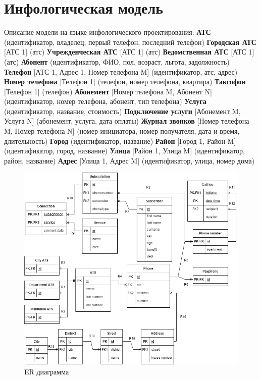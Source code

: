 \documentclass{report}
\begin{document}
\section{Инфологическая модель}
Описание модели на языке инфологического проектирования:
\newline\textbf{АТС} (идентификатор, владелец, первый телефон, последний телефон)
\newline\textbf{Городская АТС} [АТС 1] (атс)
\newline\textbf{Учрежденческая АТС} [АТС 1] (атс)
\newline\textbf{Ведомственная АТС} [АТС 1] (атс)
\newline\textbf{Абонент} (идентификатор, ФИО, пол, возраст, льгота, задолжность)
\newline\textbf{Телефон} [АТС 1, Адрес 1, Номер телефона M] (идентификатор, атс, адрес)
\newline\textbf{Номер телефона} [Телефон 1] (телефон, номер телефона, квартира)
\newline\textbf{Таксофон} [Телефон 1] (телефон)
\newline\textbf{Абонемент} [Номер телефона M, Абонент N] (идентификатор, 
номер телефона, абонент, тип телефона)
\newline\textbf{Услуга} (идентификатор, название, стоимость)
\newline\textbf{Подключение услуги} [Абонемент M, Услуга N] (абонемент, услуга, дата оплаты)
\newline\textbf{Журнал звонков} [Номер телефона M, Номер телефона N] 
(номер инициатора, номер получателя, дата и время, длительность)
\newline\textbf{Город} (идентификатор, название)
\newline\textbf{Район} [Город 1, Район M] (идентификатор, город, название)
\newline\textbf{Улица} [Район 1, Улица M] (идентификатор, район, название)
\newline\textbf{Адрес} [Улица 1, Адрес M] (идентификатор, улица, номер дома)

\begin{figure}[!ht]
    \begin{center}
    \includegraphics[width=\textwidth]{resources/er.png}
    \caption{ER диаграмма}
    \end{center}
\end{figure}
\end{document}
